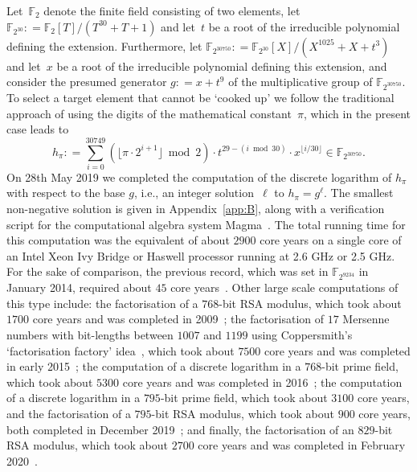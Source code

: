 \documentclass[11pt]{llncs}
\newcommand{\F}{\mathbb F}
\newcommand{\defeq}{\mathrel{\mathop:}=}
\begin{document}
Let~$\F_2$ denote the finite field consisting of two elements, let $\F_{2^{30}} \defeq \F_2[T]/(T^{30} + T + 1)$ and let~$t$ be a root of the irreducible
polynomial defining the extension. Furthermore, let $\F_{2^{30750}} \defeq \F_{2^{30}}[X]/(X^{1025} + X + t^3)$ and let~$x$ be a root of the irreducible 
polynomial defining this extension, and consider the presumed generator $g \defeq x + t^9$ of the multiplicative group of $\F_{2^{30750}}$.
To select a target element that cannot be `cooked up' we follow the traditional approach of
using the digits of the mathematical constant~$\pi$, which in the present case leads to
\[
  h_{\pi} \defeq \sum_{i=0}^{30749} \left( \lfloor \pi \cdot 2^{i+1} \rfloor \bmod{2} \right) \cdot t^{29 - (i \bmod{30})} \cdot x^{\lfloor i / 30 \rfloor}
  \in \F_{2^{30750}} .
\]
On 28th May 2019 we completed the computation of the discrete logarithm of $h_{\pi}$ with respect to the base $g$, i.e., an integer solution~$\ell$
to $h_{\pi} = g^{\ell}$. The smallest non-negative solution is given in Appendix~\ref{app:B}, along with a verification script for the computational
algebra system Magma~\cite{magma}. The total running time for this computation was the equivalent of about $\num{2900}$ core years on a 
single core of an Intel Xeon Ivy Bridge or Haswell processor running at 2.6 GHz or 2.5 GHz.
For the sake of comparison, the previous record, which was set in $\F_{2^{9234}}$ in January 2014, required about $45$ core years~\cite{9234Ann}.
Other large scale computations of this type include: the factorisation of a $768$-bit RSA modulus, which took about $\num{1700}$ core years 
and was completed in 2009~\cite{RSA768}; the factorisation of $17$ Mersenne numbers with bit-lengths between $\num{1007}$ and $\num{1199}$
using Coppersmith's `factorisation factory' idea~\cite{CoppersmithFF}, which took about $\num{7500}$ core years and was completed in early 
2015~\cite{MFF}; the computation of a discrete logarithm in a $768$-bit prime field, which took about $\num{5300}$ core years and was 
completed in 2016~\cite{DLP768}; the computation of a discrete logarithm in a $795$-bit prime field, which took about $\num{3100}$ core years, 
and the factorisation of a $795$-bit RSA modulus, which took about $900$ core years, both completed in December 2019~\cite{795Ann}; and
finally, the factorisation of an $829$-bit RSA modulus, which took about $\num{2700}$ core years and was completed in February 2020~\cite{829Ann}.
\end{document}
